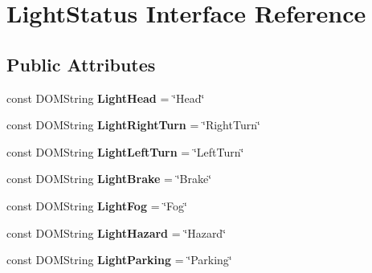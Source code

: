 \hypertarget{interfaceLightStatus}{\section{Light\+Status Interface Reference}
\label{interfaceLightStatus}
}
\subsection*{Public Attributes}
\begin{DoxyCompactItemize}
\item 
\hypertarget{interfaceLightStatus_ad5fed88abc9ab3467f85346c1a3ed523}{const D\+O\+M\+String {\bfseries Light\+Head} = \char`\"{}Head\char`\"{}}\label{interfaceLightStatus_ad5fed88abc9ab3467f85346c1a3ed523}

\item 
\hypertarget{interfaceLightStatus_aaac65b16889ad6016f9776931108de87}{const D\+O\+M\+String {\bfseries Light\+Right\+Turn} = \char`\"{}Right\+Turn\char`\"{}}\label{interfaceLightStatus_aaac65b16889ad6016f9776931108de87}

\item 
\hypertarget{interfaceLightStatus_a8089ab1202153ff2924a2215bfc70ecd}{const D\+O\+M\+String {\bfseries Light\+Left\+Turn} = \char`\"{}Left\+Turn\char`\"{}}\label{interfaceLightStatus_a8089ab1202153ff2924a2215bfc70ecd}

\item 
\hypertarget{interfaceLightStatus_a8327693a866627c74d0fd1756dbef63b}{const D\+O\+M\+String {\bfseries Light\+Brake} = \char`\"{}Brake\char`\"{}}\label{interfaceLightStatus_a8327693a866627c74d0fd1756dbef63b}

\item 
\hypertarget{interfaceLightStatus_acb751728107b12b31faac160908322d1}{const D\+O\+M\+String {\bfseries Light\+Fog} = \char`\"{}Fog\char`\"{}}\label{interfaceLightStatus_acb751728107b12b31faac160908322d1}

\item 
\hypertarget{interfaceLightStatus_ac3fa4b04ad2c5d9fbed6cb2603004878}{const D\+O\+M\+String {\bfseries Light\+Hazard} = \char`\"{}Hazard\char`\"{}}\label{interfaceLightStatus_ac3fa4b04ad2c5d9fbed6cb2603004878}

\item 
\hypertarget{interfaceLightStatus_a2a2cdf6c21d27b16240a8b6be1dca8a4}{const D\+O\+M\+String {\bfseries Light\+Parking} = \char`\"{}Parking\char`\"{}}\label{interfaceLightStatus_a2a2cdf6c21d27b16240a8b6be1dca8a4}


\end{DoxyCompactItemize}
